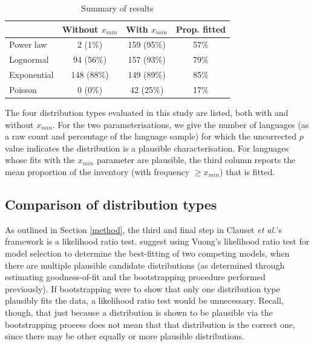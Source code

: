\begin{table}

\caption{\label{tab:results-summary}Summary of results}
\centering
\begin{threeparttable}
\begin{tabular}[t]{lccc}
\toprule
\textbf{ } & \textbf{Without $x_{min}$} & \textbf{With $x_{min}$} & \textbf{Prop. fitted}\\
\midrule
Power law & 2 (1\%) & 159 (95\%) & 57\%\\
Lognormal & 94 (56\%) & 157 (93\%) & 79\%\\
Exponential & 148 (88\%) & 149 (89\%) & 85\%\\
Poisson & 0 (0\%) & 42 (25\%) & 17\%\\
\bottomrule
\end{tabular}
\begin{tablenotes}
\item The four distribution types evaluated in this study are listed, both with and without $x_{min}$. For the two parameterisations, we give the number of languages (as a raw count and percentage of the language sample) for which the uncorrected $p$ value indicates the distribution is a plausible characterisation. For languages whose fits with the $x_{min}$ parameter are plausible, the third column reports the mean proportion of the inventory (with frequency $\geq x_{min}$) that is fitted.
\end{tablenotes}
\end{threeparttable}
\end{table}

\hypertarget{comparison-of-distribution-types}{%
\subsection{Comparison of distribution types}\label{comparison-of-distribution-types}}

As outlined in Section \ref{method}, the third and final step in Clauset \emph{et al.}'s \autocite*{clauset_power-law_2009} framework is a likelihood ratio test. \textcite{clauset_power-law_2009} suggest using Vuong's \autocite*{vuong_likelihood_1989} likelihood ratio test for model selection to determine the best-fitting of two competing models, when there are multiple plausible candidate distributions (as determined through estimating goodness-of-fit and the bootstrapping procedure performed previously). If bootstrapping were to show that only one distribution type plausibly fits the data, a likelihood ratio test would be unnecessary. Recall, though, that just because a distribution is shown to be plausible via the bootstrapping process does not mean that that distribution is the correct one, since there may be other equally or more plausible distributions.

